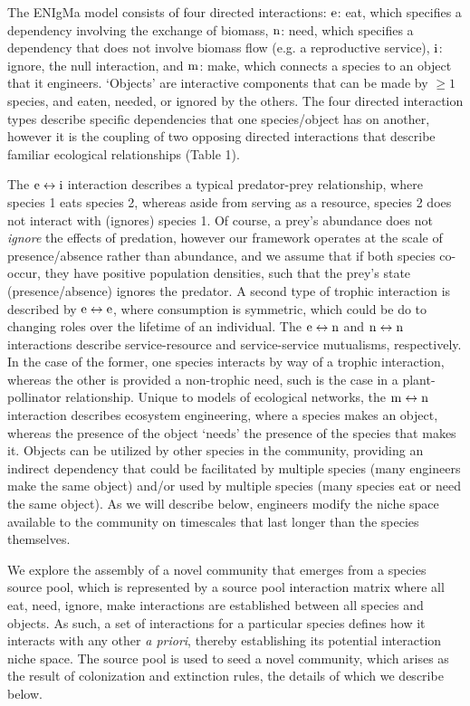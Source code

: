 \documentclass[twocolumn,preprintnumbers,amsmath,amssymb,superscriptaddress]{revtex4}
\newcommand{\rr}[1]{{\rm #1}}
\begin{document}

The ENIgMa model consists of four directed interactions:
$\rr{e}$: eat, which specifies a dependency involving the exchange of biomass,
$\rr{n}$: need, which specifies a dependency that does not involve biomass flow (e.g. a reproductive service),
$\rr{i}$: ignore, the null interaction, and
$\rr{m}$: make, which connects a species to an object that it engineers. 
`Objects' are interactive components that can be made by $\geq 1$ species, and eaten, needed, or ignored by the others.
The four directed interaction types describe specific dependencies that one species/object has on another, however it is the coupling of two opposing directed interactions that describe familiar ecological relationships (Table 1).

The $\rr{e} \leftrightarrow \rr{i}$ interaction describes a typical predator-prey relationship, where species 1 eats species 2, whereas aside from serving as a resource, species 2 does not interact with (ignores) species 1.
Of course, a prey's abundance does not \emph{ignore} the effects of predation, however our framework operates at the scale of presence/absence rather than abundance, and we assume that if both species co-occur, they have positive population densities, such that the prey's state (presence/absence) ignores the predator.
A second type of trophic interaction is described by $\rr{e} \leftrightarrow \rr{e}$, where consumption is symmetric, which could be do to changing roles over the lifetime of an individual.
The $\rr{e} \leftrightarrow \rr{n}$ and $\rr{n} \leftrightarrow \rr{n}$ interactions describe service-resource and service-service mutualisms, respectively.
In the case of the former, one species interacts by way of a trophic interaction, whereas the other is provided a non-trophic need, such is the case in a plant-pollinator relationship.
Unique to models of ecological networks, the $\rr{m} \leftrightarrow \rr{n}$ interaction describes ecosystem engineering, where a species makes an object, whereas the presence of the object `needs' the presence of the species that makes it.
Objects can be utilized by other species in the community, providing an indirect dependency that could be facilitated by multiple species (many engineers make the same object) and/or used by multiple species (many species eat or need the same object).
As we will describe below, engineers modify the niche space available to the community on timescales that last longer than the species themselves.

We explore the assembly of a novel community that emerges from a species source pool, which is represented by a source pool interaction matrix where all eat, need, ignore, make interactions are established between all species and objects.
As such, a set of interactions for a particular species defines how it interacts with any other \emph{a priori}, thereby establishing its potential interaction niche space.
The source pool is used to seed a novel community, which arises as the result of colonization and extinction rules, the details of which we describe below.
\end{document}
